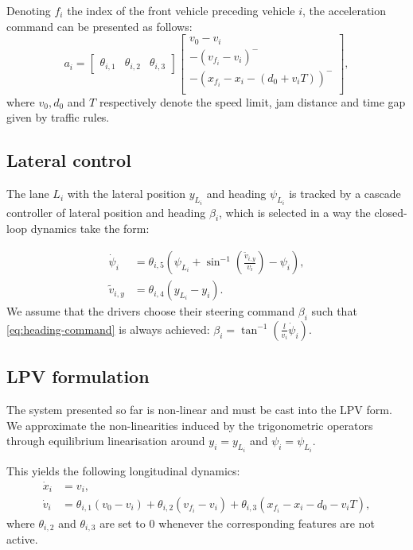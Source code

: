 \documentclass{article}
\begin{document}
Denoting $f_i$ the index of the front vehicle preceding vehicle $i$, the acceleration command can be presented as follows:
\begin{equation*}
	a_i = \begin{bmatrix}
	\theta_{i,1} & \theta_{i,2} & \theta_{i,3}
	\end{bmatrix} \begin{bmatrix}
		v_0 - v_i \\
		-(v_{f_i}-v_i)^- \\
		-(x_{f_i} - x_i - (d_0 + v_iT))^- \\
	\end{bmatrix},
	\label{eq:theta_a}
\end{equation*}
where $v_0, d_0$ and $T$ respectively denote the speed limit, jam distance and time gap given by traffic rules.

\subsection{Lateral control}

The lane $L_i$ with the lateral position $y_{L_i}$ and heading $\psi_{L_i}$ is tracked by a cascade controller of lateral position and heading $\beta_i$, which is selected in a way the closed-loop dynamics take the form:

\begin{align}
	\label{eq:heading-command}
    \dot{\psi}_i &= \theta_{i,5}\left(\psi_{L_i}+\sin^{-1}\left(\frac{\tilde{v}_{i,y}}{v_i}\right)-\psi_i\right),\\
    \tilde{v}_{i,y} &= \theta_{i,4} (y_{L_i}-y_i). \nonumber
\end{align}
We assume that the drivers choose their steering command $\beta_i$ such that \eqref{eq:heading-command} is always achieved: $\beta_i = \tan^{-1}(\frac{l}{v_i}\dot{\psi}_i)$.

\subsection{LPV formulation}

The system presented so far is non-linear and must be cast into the LPV form. We approximate the non-linearities induced by the trigonometric operators through equilibrium linearisation around $y_i=y_{L_i}$ and $\psi_i=\psi_{L_i}$.

This yields the following longitudinal dynamics:
\begin{align*}
\dot{x}_i &= v_i,\\
\dot v_i &= \theta_{i,1} (v_0 - v_i) + \theta_{i,2} (v_{f_i} - v_i) + \theta_{i,3}(x_{f_i} - x_i - d_0 - v_i T),
\end{align*}
where $\theta_{i,2}$ and $\theta_{i,3}$ are set to $0$ whenever the corresponding features are not active.
\end{document}
